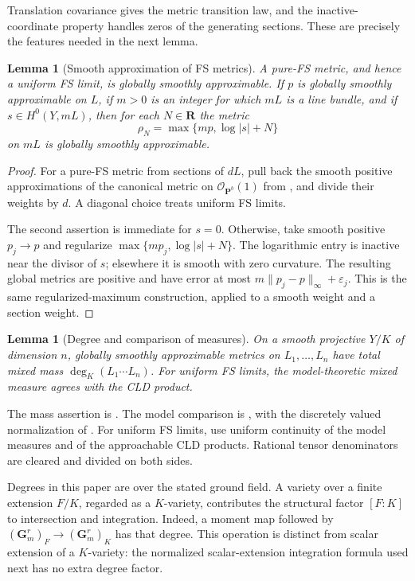 \documentclass[11pt]{amsart}
\newtheorem{lemma}[theorem]{Lemma}
\theoremstyle{definition}
\theoremstyle{remark}
\numberwithin{equation}{section}
\newcommand{\R}{\mathbf R}
\newcommand{\PP}{\mathbf P}
\newcommand{\OO}{\mathcal O}
\begin{document}
Translation covariance gives the metric transition law, and the
inactive-coordinate property handles zeros of the generating sections.
These are precisely the features needed in the next lemma.

\begin{lemma}[Smooth approximation of FS metrics]\label{lem:smooth-fs}
A pure-FS metric, and hence a uniform FS limit, is globally smoothly
approximable. If \(p\) is globally smoothly approximable on \(L\),
if \(m>0\) is an integer for which \(mL\) is a line bundle, and if
\(s\in H^0(Y,mL)\), then for each \(N\in\R\) the metric
\[
 \rho_N=\max\{mp,\log|s|+N\}
\]
on \(mL\) is globally smoothly approximable.
\end{lemma}

\begin{proof}
For a pure-FS metric from sections of \(dL\), pull back the smooth
positive approximations of the canonical metric on
\(\OO_{\PP^b}(1)\) from \cite[Proposition 6.3.2]{CLD12}, and
divide their weights by \(d\). A diagonal choice treats uniform
FS limits.

The second assertion is immediate for \(s=0\). Otherwise, take
smooth positive \(p_j\to p\) and regularize \(\max\{mp_j,\log|s|+N\}\).
The logarithmic entry is inactive near the divisor of \(s\);
elsewhere it is smooth with zero curvature. The resulting global
metrics are positive and have error at most
\(m\|p_j-p\|_\infty+\varepsilon_j\).
This is the same regularized-maximum construction, applied to a
smooth weight and a section weight.
\end{proof}

\begin{lemma}[Degree and comparison of measures]\label{lem:degree}
On a smooth projective \(Y/K\) of dimension \(n\), globally smoothly
approximable metrics on \(L_1,\ldots,L_n\) have total mixed mass
\(\deg_K(L_1\cdots L_n)\). For uniform FS limits, the model-theoretic
mixed measure agrees with the CLD product.
\end{lemma}

The mass assertion is \cite[Corollary 6.4.4]{CLD12}.
The model comparison is
\cite[Theorem 6.9.3 and Proposition 6.9.7]{CLD12}, with the
discretely valued normalization of \cite[Section 6.9.6]{CLD12}.
For uniform FS limits, use uniform continuity of the model
measures \cite[Proposition 2.23(d) and Remark 2.24]{BGM} and of
the approachable CLD products. Rational tensor denominators are
cleared and divided on both sides.

Degrees in this paper are over the stated ground field. A variety
over a finite extension \(F/K\), regarded as a \(K\)-variety,
contributes the structural factor \([F:K]\) to intersection and
integration. Indeed, a moment map followed by
\((\mathbf G_m^r)_F\to(\mathbf G_m^r)_K\) has that degree.
This operation is distinct from scalar extension of a \(K\)-variety:
the normalized scalar-extension integration formula used next has
no extra degree factor.
\end{document}
